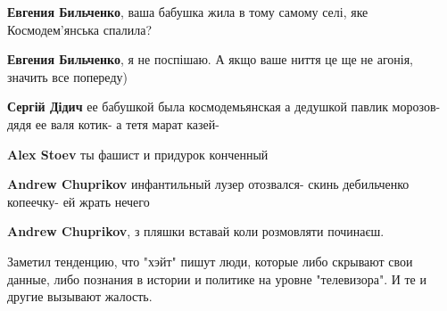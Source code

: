 \begin{itemize}
\begin{itemize}
\textbf{Евгения Бильченко}, ваша бабушка жила в тому самому селі, яке Космодем'янська спалила?

 
\textbf{Евгения Бильченко}, я не поспішаю. А якщо ваше ниття це ще не агонія, значить все попереду)

 
\textbf{Сергій Дідич} ее бабушкой была космодемьянская а дедушкой павлик морозов-дядя ее валя котик- а тетя марат казей-

 
\textbf{Alex Stoev} ты фашист и придурок конченный

 
\textbf{Andrew Chuprikov} инфантильный лузер отозвался- скинь дебильченко копеечку- ей жрать нечего

 
\textbf{Andrew Chuprikov}, з пляшки вставай коли розмовляти починаєш.

 

Заметил тенденцию, что "хэйт" пишут люди, которые либо скрывают свои данные,
либо познания в истории и политике на уровне "телевизора". И те и другие
вызывают жалость.


\end{itemize}
\end{itemize}
